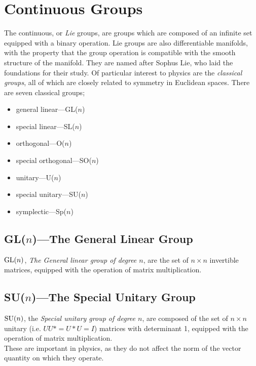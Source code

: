 \documentclass[]{dwnotes}
\begin{document}
\section{Continuous Groups}
\label{sec:contgroups}

The continuous, or \emph{Lie} groups, are groups which are composed of
an infinite set equipped with a binary operation. Lie groups are also
differentiable manifolds, with the property that the group operation
is compatible with the smooth structure of the manifold. They are
named after Sophus Lie, who laid the foundations for their study. Of
particular interest to physics are the \emph{classical groups}, all of which are closely related to symmetry in Euclidean spaces. There are seven classical groups; 
\begin{itemize}
\item general linear---GL($n$)
\item special linear---SL($n$)
\item orthogonal---O($n$)
\item special orthogonal---SO($n$)
\item unitary---U($n$)
\item special unitary---SU($n$)
\item symplectic---Sp($n$)
\end{itemize}

\subsection{GL($n$)---The General Linear Group}
\label{sec:genlinear}

${\rm GL}(n)$, \emph{The General linear group of degree $n$}, are the
set of $n\times n$ invertible matrices, equipped with the operation of
matrix multiplication.

\subsection{SU($n$)---The Special Unitary Group}
\label{sec:su3}

${\rm SU}(n)$, the \emph{Special unitary group of degree $n$}, are
composed of the set of $n\times n$ unitary (i.e. $UU* = U*U = I$)
matrices with determinant
1, equipped with the operation of matrix multiplication.\\
These are important in physics, as they do not affect the norm of the
vector quantity on which they operate.
\end{document}
